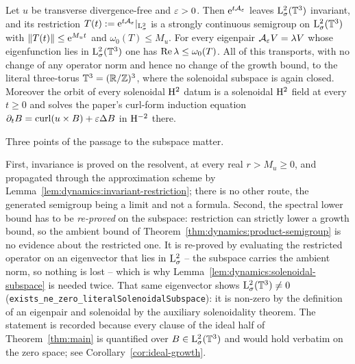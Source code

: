 \begin{theorem}
  \label{thm:dynamics:solenoidal-semigroup}
  \leanok
  Let $u $ be transverse divergence-free and $\varepsilon>0 $.  Then $\mathrm{e}^{t\mathcal A_\varepsilon} $ leaves
  $\mathrm{L}^2_\sigma(\mathbb{T}^3) $ invariant, and its restriction
  $T(t):=\mathrm{e}^{t\mathcal A_\varepsilon}|_{\mathrm{L}^2_\sigma} $ is a strongly continuous semigroup on
  $\mathrm{L}^2_\sigma(\mathbb{T}^3) $ with $\left\|T(t)\right\|\leq\mathrm{e}^{M_ut} $ and $\omega_0(T)\leq M_u $.  For
  every eigenpair $\mathcal A_\varepsilon V=\lambda V $ whose eigenfunction lies in
  $\mathrm{L}^2_\sigma(\mathbb{T}^3) $ one has $\operatorname{Re}\lambda\leq\omega_0(T) $.  All of this transports, with
  no change of any operator norm and hence no change of the growth bound, to the literal
  three-torus $\mathbb{T}^3=(\mathbb{R}/\mathbb{Z})^3 $, where the solenoidal subspace is again closed.  Moreover
  the orbit of every solenoidal $\mathrm{H}^2 $ datum is a solenoidal $\mathrm{H}^2 $ field at every
  $t\geq0 $ and solves the paper's curl-form induction equation
  $\partial_tB=\operatorname{curl}(u\times B)+\varepsilon\Delta B $ in $\mathrm{H}^{-2} $ there.
\end{theorem}

Three points of the passage to the subspace matter.

First, invariance is proved on the resolvent, at every real $r>M_u\geq0 $, and propagated
through the approximation scheme by Lemma~\ref{lem:dynamics:invariant-restriction}; there is
no other route, the generated semigroup being a limit and not a formula.  Second, the
spectral lower bound has to be \emph{re-proved} on the subspace: restriction can strictly
lower a growth bound, so the ambient bound of
Theorem~\ref{thm:dynamics:product-semigroup} is no evidence about the restricted one.  It is
re-proved by evaluating the restricted operator on an eigenvector that lies in
$\mathrm{L}^2_\sigma $ -- the subspace carries the ambient norm, so nothing is lost -- which is why
Lemma~\ref{lem:dynamics:solenoidal-subspace} is needed twice.  That same eigenvector shows
$\mathrm{L}^2_\sigma(\mathbb{T}^3)\neq0$ (\texttt{exists\_ne\_zero\_literalSolenoidalSubspace}): it is
non-zero by the definition of an eigenpair and solenoidal by the auxiliary solenoidality
theorem.  The statement is recorded because every clause of the ideal half of
Theorem~\ref{thm:main} is quantified over $B\in\mathrm{L}^2_\sigma(\mathbb{T}^3) $ and would hold verbatim
on the zero space; see Corollary~\ref{cor:ideal-growth}.

